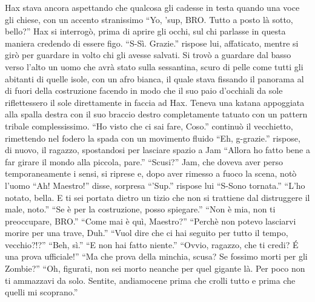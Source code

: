     Hax stava ancora aspettando che qualcosa gli cadesse in testa quando
    una voce gli chiese, con un accento stranissimo ``Yo, 'sup, BRO. Tutto a
    posto là sotto, bello?'' Hax si interrogò, prima di aprire gli occhi,
    sul chi parlasse in questa maniera credendo di essere  figo. ``S-Sì.
    Grazie.'' rispose lui, affaticato, mentre si girò per guardare in volto
    chi gli avesse salvati. Si trovò a guardare dal basso verso l'alto un
    uomo che avrà stato sulla sessantina, scuro di pelle come tutti gli
    abitanti di quelle isole, con un afro bianca, il quale stava fissando
    il panorama al di fuori della costruzione facendo in modo che il suo paio d'occhiali da
    sole riflettessero il sole direttamente in faccia ad Hax.
    Teneva una katana appoggiata alla spalla destra con il suo braccio
    destro completamente tatuato con un pattern tribale complessissimo.
    ``Ho visto che ci sai fare, Coso.'' continuò il vecchietto, rimettendo
    nel fodero la spada con un movimento fluido ``Eh, g-grazie.'' rispose,
    di nuovo, il ragazzo, spostandosi per lasciare spazio a Jam ``Allora ho
    fatto bene a far girare il mondo alla piccola, pare.'' ``Scusi?'' Jam,
    che doveva aver perso temporaneamente i sensi, si riprese e, dopo aver
    rimesso a fuoco la scena, notò l'uomo ``Ah! Maestro!'' disse, sorpresa
    ``'Sup.'' rispose lui ``S-Sono tornata.'' ``L'ho notato, bella. E ti
    sei portata dietro un tizio che non si trattiene dal distruggere il
    male, noto.'' ``Se è per la costruzione, posso spiegare.'' ``Non è
    mia, non ti preoccupare, BRO.'' ``Come mai è quì, Maestro?'' ``Perchè
    non potevo lasciarvi morire per una trave, Duh.'' ``Vuol dire che ci
    hai seguito per tutto il tempo, vecchio?!?'' ``Beh, sì.'' ``E non hai
    fatto niente.'' ``Ovvio, ragazzo, che ti credi? \'E una prova
    ufficiale!'' ``Ma che prova della minchia, scusa? Se fossimo morti per
    gli Zombie?'' ``Oh, figurati, non sei morto neanche per quel gigante
    là. Per poco non ti ammazzavi da solo. Sentite, andiamocene prima che
    crolli tutto e prima che quelli mi scoprano.''

